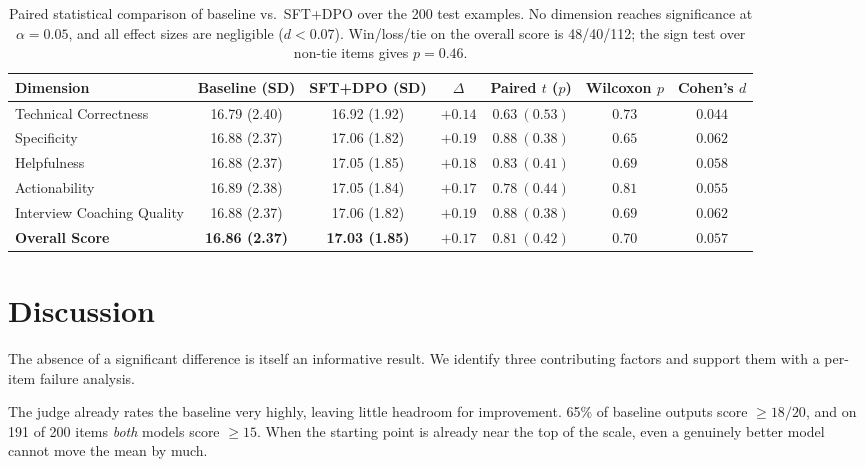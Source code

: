 \begin{table}[t]
  \centering
  \small
  \begin{tabular}{@{}lcccccc@{}}
    \toprule
    Dimension & Baseline (SD) & SFT+DPO (SD) & $\Delta$ & Paired $t$ ($p$) & Wilcoxon $p$ & Cohen's $d$ \\
    \midrule
    Technical Correctness        & 16.79 (2.40) & 16.92 (1.92) & $+0.14$ & $0.63\ (0.53)$ & $0.73$ & $0.044$ \\
    Specificity                  & 16.88 (2.37) & 17.06 (1.82) & $+0.19$ & $0.88\ (0.38)$ & $0.65$ & $0.062$ \\
    Helpfulness                  & 16.88 (2.37) & 17.05 (1.85) & $+0.18$ & $0.83\ (0.41)$ & $0.69$ & $0.058$ \\
    Actionability                & 16.89 (2.38) & 17.05 (1.84) & $+0.17$ & $0.78\ (0.44)$ & $0.81$ & $0.055$ \\
    Interview Coaching Quality   & 16.88 (2.37) & 17.06 (1.82) & $+0.19$ & $0.88\ (0.38)$ & $0.69$ & $0.062$ \\
    \midrule
    \textbf{Overall Score}       & \textbf{16.86 (2.37)} & \textbf{17.03 (1.85)} & $\mathbf{+0.17}$ & $\mathbf{0.81\ (0.42)}$ & $\mathbf{0.70}$ & $\mathbf{0.057}$ \\
    \bottomrule
  \end{tabular}
  \caption{Paired statistical comparison of baseline vs.\ SFT+DPO over the 200
  test examples. No dimension reaches significance at $\alpha=0.05$, and all
  effect sizes are negligible ($d<0.07$). Win/loss/tie on the overall score is
  48/40/112; the sign test over non-tie items gives $p=0.46$.}
  \label{tab:stats}
\end{table}

\section{Discussion}
\label{sec:discussion}

The absence of a significant difference is itself an informative result. We
identify three contributing factors and support them with a per-item failure
analysis.

 The judge already rates the baseline very highly,
leaving little headroom for improvement. 65\% of baseline outputs score
$\geq 18/20$, and on 191 of 200 items \emph{both} models score $\geq 15$. When
the starting point is already near the top of the scale, even a genuinely
better model cannot move the mean by much.

